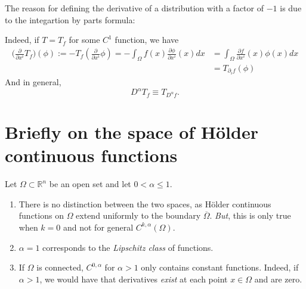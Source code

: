 The reason for defining the derivative of a distribution with a factor of $-1$ is due to the integartion by parts formula:

Indeed, if $T=T_f$ for some $C^1$ function, we have \begin{align*}\Big(\frac{\partial}{\partial x^i}T_f \Big)(\phi):=-T_f(\frac{\partial}{\partial x^i}\phi)=-\int_{\Omega} f(x)\frac{\partial \phi}{\partial x^i}(x) dx&=\int_{\Omega} \frac{\partial f}{\partial x^i}(x) \phi(x)dx \\ &= T_{\partial_i f}(\phi)  \end{align*}
And in general, $$D^{\alpha}T_f\equiv T_{D^{\alpha}f}. $$



\section{Briefly on the space of H\"{o}lder continuous functions}\label{app:holder}
Let $\Omega\subset\mathbb{R}^n$ be an open set and let
$0<\alpha\leq 1$.

\begin{remark}
\begin{enumerate}
\item There is no distinction between the two spaces, as H\"{o}lder continuous functions on $\Omega$ extend uniformly to the boundary $\overline{\Omega}$. \emph{But}, this is only true when $k=0$ and not for general $C^{k,\alpha}(\Omega)$.
\item $\alpha=1$ corresponds to the \emph{Lipschitz class} of functions.
\item If $\Omega$ is connected, $C^{0,\alpha}$ for $\alpha>1$ only contains constant functions. Indeed, if $\alpha>1$, we would have that derivatives \emph{exist} at each point $x\in \Omega$ and are zero.    
\end{enumerate}
\end{remark}

